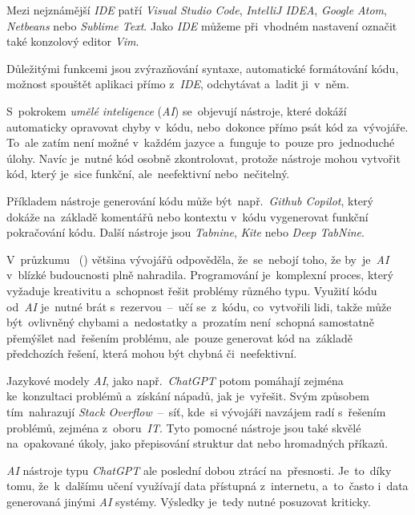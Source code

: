 \documentclass[10pt,a4paper]{article}
\begin{document}
        Mezi nejznámější \emph{IDE} patří \emph{Visual Studio Code}, \emph{IntelliJ IDEA}, \emph{Google Atom}, \emph{Netbeans} nebo \emph{Sublime Text}. Jako \emph{IDE} můžeme při~vhodném nastavení označit také konzolový editor \emph{Vim}.
        
        Důležitými funkcemi jsou zvýrazňování syntaxe, automatické formátování kódu, možnost spouštět aplikaci přímo z~\emph{IDE}, odchytávat a~ladit ji~v~něm. \cite{IDE}
        
        S~pokrokem \emph{umělé inteligence} (\emph{AI}) se~objevují nástroje, které dokáží automaticky opravovat chyby v~kódu, nebo~dokonce přímo psát kód za~vývojáře. To~ale zatím není možné v~každém jazyce a~funguje to~pouze pro~jednoduché úlohy. Navíc je~nutné kód osobně zkontrolovat, protože nástroje mohou vytvořit kód, který je~sice funkční, ale~neefektivní nebo~nečitelný.

        Příkladem nástroje generování kódu může být~např.~\emph{Github Copilot}, který dokáže na~základě komentářů nebo kontextu v~kódu vygenerovat funkční pokračování kódu. Další nástroje jsou \emph{Tabnine}, \emph{Kite} nebo \emph{Deep TabNine}. \cite{sz:AI}
        
        V~průzkumu ~(\cite{zerotomasteryStateOfAI}) většina vývojářů odpověděla, že~se~nebojí toho, že by~je~\emph{AI} v~blízké budoucnosti plně nahradila. Programování je~komplexní proces, který vyžaduje kreativitu a~schopnost řešit problémy různého typu. Využití kódu od~\emph{AI} je~nutné brát s~rezervou~--~učí se~z~kódu, co~vytvořili lidi, takže může být~ovlivněný chybami a~nedostatky a~prozatím není~schopná samostatně přemýšlet nad~řešením problému, ale~pouze generovat kód na~základě předchozích řešení, která mohou být chybná či~neefektivní.
        
        Jazykové modely \emph{AI}, jako např.~\emph{ChatGPT} potom pomáhají zejména ke~konzultaci problémů a~získání nápadů, jak je~vyřešit. Svým způsobem tím~nahrazují \emph{Stack Overflow}~--~síť, kde~si vývojáři navzájem radí s~řešením problémů, zejména z~oboru~\emph{IT}. Tyto pomocné nástroje jsou také skvělé na~opakované úkoly, jako přepisování struktur dat nebo hromadných příkazů.

        \emph{AI} nástroje typu \emph{ChatGPT} ale poslední dobou ztrácí na~přesnosti. Je~to~díky tomu, že~k~dalšímu učení využívají data přístupná z~internetu, a~to~často i~data generovaná jinými \emph{AI} systémy. Výsledky je~tedy nutné posuzovat kriticky. \cite{computerworld:AI}
\end{document}
